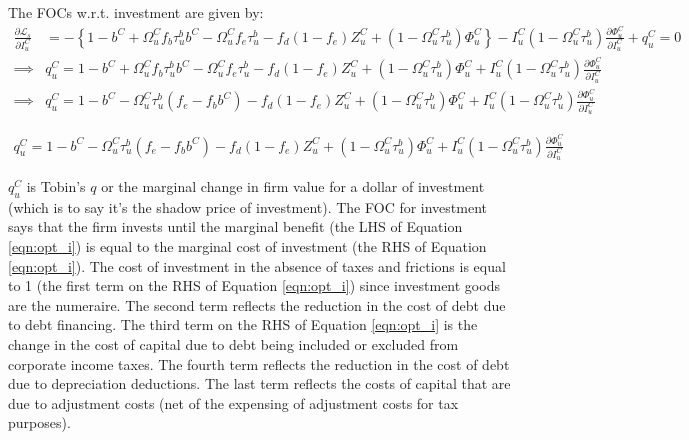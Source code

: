 \documentclass[article,11pt,letterpaper,fleqn]{article}
\theoremstyle{definition}
\numberwithin{equation}{section}
\begin{document}
The FOCs w.r.t. investment are given by:
 \begin{equation}
\label{eqn:foc_i}
\begin{split}
\frac{\partial \mathcal{L}_{s}}{\partial I^{C}_{u}} & = -\left\{1-b^{C}+\Omega^{C}_{u}f_{b}\tau^{b}_{u}b^{C}-\Omega^{C}_{u}f_{e}\tau^{b}_{u} - f_{d}(1-f_{e})Z^{C}_{u} + (1-\Omega^{C}_{u}\tau^{b}_{u})\Phi^{C}_{u}\right\} - I^{C}_{u}(1-\Omega^{C}_{u}\tau^{b}_{u})\frac{\partial \Phi^{C}_{u}}{\partial I^{C}_{u}} + q^{C}_{u} = 0 \\
\implies & q^{C}_{u}  = 1-b^{C}+\Omega^{C}_{u}f_{b}\tau^{b}_{u}b^{C}-\Omega^{C}_{u}f_{e}\tau^{b}_{u} - f_{d}(1-f_{e})Z^{C}_{u} + (1-\Omega^{C}_{u}\tau^{b}_{u})\Phi^{C}_{u} +  I^{C}_{u}(1-\Omega^{C}_{u}\tau^{b}_{u})\frac{\partial \Phi^{C}_{u}}{\partial I^{C}_{u}} \\
\implies & q^{C}_{u}  = 1-b^{C}-\Omega^{C}_{u}\tau^{b}_{u}(f_{e}-f_{b}b^{C}) - f_{d}(1-f_{e})Z^{C}_{u} + (1-\Omega^{C}_{u}\tau^{b}_{u})\Phi^{C}_{u} +  I^{C}_{u}(1-\Omega^{C}_{u}\tau^{b}_{u})\frac{\partial \Phi^{C}_{u}}{\partial I^{C}_{u}} 
\end{split}
\end{equation}

 \begin{equation}
\label{eqn:opt_i}
\begin{split}
 q^{C}_{u}  = 1-b^{C}-\Omega^{C}_{u}\tau^{b}_{u}(f_{e}-f_{b}b^{C}) - f_{d}(1-f_{e})Z^{C}_{u} + (1-\Omega^{C}_{u}\tau^{b}_{u})\Phi^{C}_{u} +  I^{C}_{u}(1-\Omega^{C}_{u}\tau^{b}_{u})\frac{\partial \Phi^{C}_{u}}{\partial I^{C}_{u}} 
\end{split}
\end{equation}

$q^{C}_{u}$ is Tobin's $q$ or the marginal change in firm value for a dollar of investment (which is to say it's the shadow price of investment).  The FOC for investment says that the firm invests until the marginal benefit (the LHS of Equation \ref{eqn:opt_i}) is equal to the marginal cost of investment (the RHS of Equation \ref{eqn:opt_i}).  The cost of investment in the absence of taxes and frictions is equal to 1 (the first term on the RHS of Equation \ref{eqn:opt_i}) since investment goods are the numeraire.  The second term reflects the reduction in the cost of debt due to debt financing.  The third term on the RHS of Equation \ref{eqn:opt_i} is the change in the cost of capital due to debt being included or excluded from corporate income taxes.  The fourth term reflects the reduction in the cost of debt due to depreciation deductions.  The last term reflects the costs of capital that are due to adjustment costs (net of the expensing of adjustment costs for tax purposes).
\end{document}
